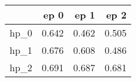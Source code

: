 \begin{tabular}{lrrr}
\toprule
{} &   ep 0 &   ep 1 &   ep 2 \\
\midrule
hp\_0 &  0.642 &  0.462 &  0.505 \\
hp\_1 &  0.676 &  0.608 &  0.486 \\
hp\_2 &  0.691 &  0.687 &  0.681 \\
\bottomrule
\end{tabular}
